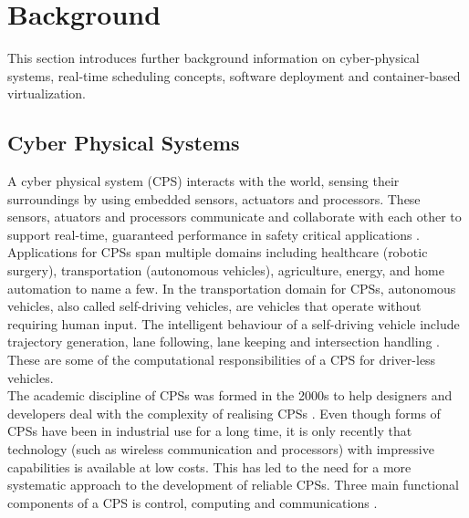 \chapter{Background} \label{sect:background} 
This section introduces further background information on cyber-physical systems, real-time scheduling concepts, software deployment and container-based virtualization.
\section{Cyber Physical Systems}

A cyber physical system (CPS) interacts with the world, sensing their surroundings by using embedded sensors, actuators and processors. These sensors, atuators and processors communicate and collaborate with each other to support real-time, guaranteed performance in safety critical applications \cite{sidcyber}. Applications for CPSs span multiple domains including healthcare (robotic surgery), transportation (autonomous vehicles), agriculture, energy, and home automation to name a few. In the transportation domain for CPSs, autonomous vehicles, also called self-driving vehicles, are vehicles that operate without requiring human input. The intelligent behaviour of a self-driving vehicle include trajectory generation, lane following, lane keeping and intersection handling \cite{sidcyber}. These are some of the computational responsibilities of a CPS for driver-less vehicles.\\ 

The academic discipline of CPSs was formed in the 2000s \cite{alur} to help designers and developers deal with the complexity of realising CPSs \cite{gonz}. Even though forms of CPSs have been in industrial use for a long time, it is only recently that technology (such as wireless communication and processors) with impressive capabilities is available at low costs. This has led to the need for a more systematic approach to the development of reliable CPSs. Three main functional components of a CPS is control, computing and communications \cite{alur}.\\

